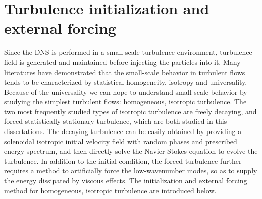\section{Turbulence initialization and external forcing}
Since the DNS is performed in a small-scale turbulence environment, turbulence field is generated and maintained before injecting the particles into it. Many literatures \cite{Eswaran1988} have demonstrated that the small-scale behavior in turbulent flows tends to be characterized by statistical homogeneity, isotropy and universality. Because of the universality we can hope to understand small-scale behavior by studying the simplest turbulent flows: homogeneous, isotropic turbulence. The two most frequently studied types of isotropic turbulence are freely decaying, and forced statistically stationary turbulence, which are both studied in this dissertations. The decaying turbulence can be easily obtained by providing a solenoidal isotropic initial velocity field with random phases and prescribed energy spectrum, and then directly solve the Navier-Stokes equation to evolve the turbulence. In addition to the initial condition, the forced turbulence further requires a method to artificially force the low-wavenumber modes, so as to supply the energy dissipated by viscous effects. The initialization and external forcing method for homogeneous, isotropic turbulence are introduced below. 

